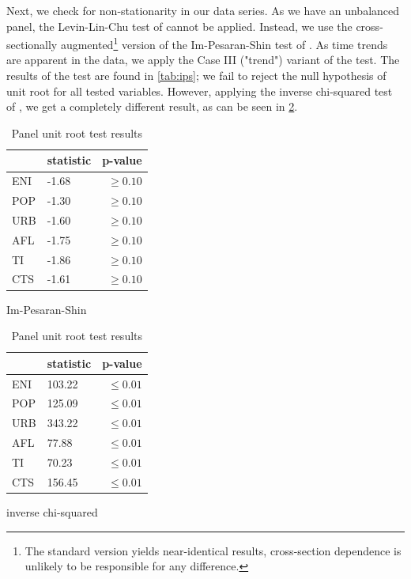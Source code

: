 \documentclass[12pt,a4paper]{article}
\begin{document}
Next, we check for non-stationarity in our data series. 
As we have an unbalanced panel, the Levin-Lin-Chu test of \cite{levinUnitRootTests2002} cannot be applied.
Instead, we use the cross-sectionally augmented\footnote{The standard version yields near-identical results, cross-section dependence is unlikely to be responsible for any difference.} version of the Im-Pesaran-Shin test of \cite{pesaranSimplePanelUnit2007}.
As time trends are apparent in the data, we apply the Case III ("trend") variant of the test.
The results of the test are found in \cref{tab:ips}; we fail to reject the null hypothesis of unit root for all tested variables.
However, applying the inverse chi-squared test of \cite{maddalaComparativeStudyUnit1999}, we get a completely different result, as can be seen in \cref{tab:madwu}.

\begin{table}[htbp]
\centering
\begin{subtable}{0.45\textwidth}
\centering
\begin{tabular}{llr}
\toprule
{} & statistic &      p-value \\
\midrule
ENI &     -1.68 &  $\geq 0.10$ \\
POP &     -1.30 &  $\geq 0.10$ \\
URB &     -1.60 &  $\geq 0.10$ \\
AFL &     -1.75 &  $\geq 0.10$ \\
TI  &     -1.86 &  $\geq 0.10$ \\
CTS &     -1.61 &  $\geq 0.10$ \\
\bottomrule
\end{tabular}


\caption{Im-Pesaran-Shin}
\label{tab:ips}
\end{subtable}
\begin{subtable}{0.45\textwidth}
\centering
\begin{tabular}{llr}
\toprule
{} & statistic &      p-value \\
\midrule
ENI &    103.22 &  $\leq 0.01$ \\
POP &    125.09 &  $\leq 0.01$ \\
URB &    343.22 &  $\leq 0.01$ \\
AFL &     77.88 &  $\leq 0.01$ \\
TI  &     70.23 &  $\leq 0.01$ \\
CTS &    156.45 &  $\leq 0.01$ \\
\bottomrule
\end{tabular}
\caption{inverse chi-squared}
\label{tab:madwu}
\end{subtable}
\caption{Panel unit root test results}
\end{table}
\end{document}

